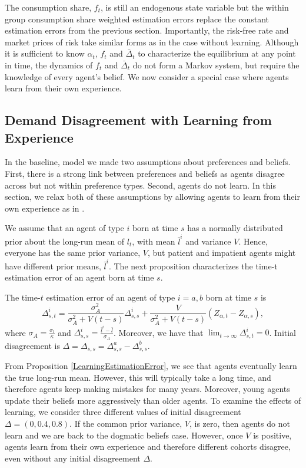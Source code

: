 The consumption share, $f_t$, is still an endogenous state variable but the within group consumption share weighted estimation errors replace the constant estimation errors from the previous section. Importantly, the risk-free rate and market prices of risk take similar forms as in the case without learning. Although it is sufficient to know $\alpha_t$, $f_t$ and $\bar{\Delta}_t$ to characterize the equilibrium at any point in time, the dynamics of $f_t$ and $\bar{\Delta}_t$ do not form a Markov system, but require the knowledge of every agent's belief. We now consider a special case where agents learn from their own experience. 

\subsection{Demand Disagreement with Learning from Experience}

In the baseline, model we made two assumptions about preferences and beliefs. First, there is a strong link between preferences and beliefs as agents disagree across but not within preference types. Second, agents do not learn. In this section, we relax both of these assumptions by allowing agents to learn from their own experience as in . 

We assume that an agent of type $i$ born at time $s$ has a normally distributed prior about the long-run mean of $l_t$, with mean $\bar{l}^i$ and variance $V$. Hence, everyone has the same prior variance, $V$, but patient and impatient agents might have different prior means, $\bar{l}^i$. The next proposition characterizes the time-t estimation error of an agent born at time $s$.
\begin{prop}\label{LearningEstimationError}
The time-$t$ estimation error of an agent of type $i=a,b$ born at time $s$ is 
\begin{equation}
	 \Delta^i_{s,t} = \frac{\sigma_{A}^2}{\sigma_{A}^2 + V\left(t-s\right)}\Delta^i_{s,s} + \frac{V}{\sigma_{A}^2 + V\left(t-s\right)}\left(Z_{\alpha,t}-Z_{\alpha,s}\right),
\end{equation}
where $\sigma_{A} = \frac{\sigma_l}{\kappa}$ and $\Delta^i_{s,s} = \frac{\bar{l}^i-\bar{l}}{\sigma_{A}}$. Moreover, we have that $\lim_{t\to\infty} \Delta^i_{s,t} =0$. Initial disagreement is  $\Delta = \Delta_{s,s}  = \Delta^a_{s,s}-\Delta^b_{s,s}$.
\end{prop} 
From Proposition \ref{LearningEstimationError}, we see that agents eventually learn the true long-run mean. However, this will typically take a long time, and therefore agents keep making mistakes for many years. Moreover, young agents update their beliefs more aggressively than older agents. To examine the effects of learning, we consider three different values of initial disagreement $\Delta = \left(0,0.4,0.8\right)$. If the common prior variance, $V$, is zero, then agents do not learn and we are back to the dogmatic beliefs case. However, once $V$ is positive, agents learn from their own experience and therefore different cohorts disagree, even without any initial disagreement $\Delta$.  

